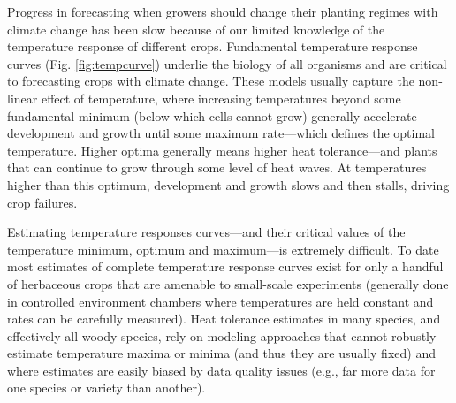 \documentclass[11pt,letter,oneside]{article}
\begin{document}
Progress in forecasting when growers should change their planting regimes with climate change has been slow because of our limited knowledge of the temperature response of different crops\cite{wang2017}. Fundamental temperature response curves (Fig. \ref{fig:tempcurve}) underlie the biology of all organisms and are critical to forecasting crops with climate change.\cite{Bennett2021,buckley2021evolution} These models usually capture the non-linear effect of temperature,\cite{parent2012} where increasing temperatures beyond some fundamental minimum (below which cells cannot grow) generally accelerate development and growth until some maximum rate---which defines the optimal temperature. Higher optima generally means higher heat tolerance---and plants that can continue to grow through some level of heat waves. At temperatures higher than this optimum, development and growth slows and then stalls, driving crop failures.\cite{luo2011temperature,anandhi2017developing}

Estimating temperature responses curves---and their critical values of the temperature minimum, optimum and maximum---is extremely difficult.\cite{garcia2010curvilinear,moralescastilla} To date most estimates of complete temperature response curves exist for only a handful of herbaceous crops that are amenable to small-scale experiments (generally done in controlled environment chambers where temperatures are held constant and rates can be carefully measured). Heat tolerance estimates in many species, and effectively all woody species, rely on modeling approaches that cannot robustly estimate temperature maxima or minima (and thus they are usually fixed) and where estimates are easily biased by data quality issues (e.g., far more data for one species or variety than another).\cite{moralescastilla,Yang2024}
\end{document}

